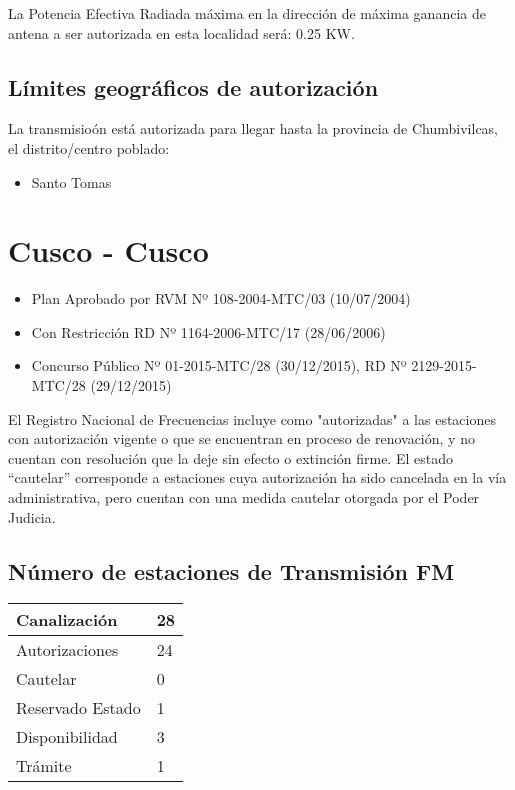 \documentclass[a4paper]{IEEEtran} %
\begin{document}
La Potencia Efectiva Radiada máxima en la dirección de máxima ganancia de antena a ser autorizada en esta localidad será: 0.25 KW.

\subsection{Límites geográficos de autorización}

La transmisioón está autorizada para llegar hasta la provincia de Chumbivilcas, el distrito/centro poblado:

\begin{itemize}
	\item Santo Tomas
\end{itemize}



\section{Cusco - Cusco}

\begin{itemize}
	\item Plan Aprobado por RVM Nº 108-2004-MTC/03 (10/07/2004)
	\item Con Restricción RD Nº 1164-2006-MTC/17 (28/06/2006)
	\item Concurso Público Nº 01-2015-MTC/28 (30/12/2015), RD Nº 2129-2015-MTC/28 (29/12/2015)
\end{itemize}

El Registro Nacional de Frecuencias incluye como "autorizadas" a las estaciones con autorización vigente o que se encuentran en proceso de renovación, y no cuentan con resolución que la deje sin efecto o extinción firme. El estado “cautelar” corresponde a estaciones cuya autorización ha sido cancelada en la vía administrativa, pero cuentan con una medida cautelar otorgada por el Poder Judicia.

\subsection{Número de estaciones de Transmisión FM}

\begin{tabular}{|l|l|} \hline
	Canalización 			& 28 \\ \hline
	Autorizaciones			& 24 \\ \hline
	Cautelar				& 0 \\ \hline
	Reservado Estado		& 1 \\ \hline
	Disponibilidad			& 3 \\ \hline
	Trámite					& 1 \\ \hline 
\end{tabular}
\end{document}
